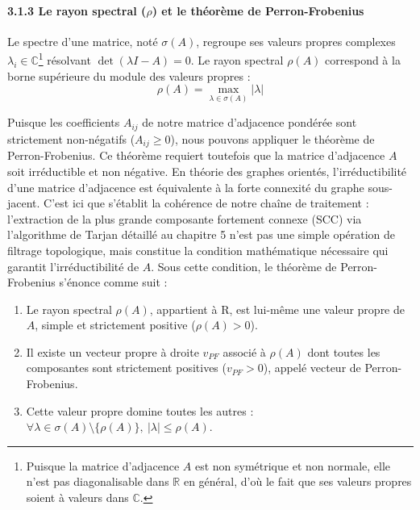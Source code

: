 \documentclass[10pt, a4paper]{article}
\providecommand{\tightlist}{}
\begin{document}
\paragraph{\texorpdfstring{3.1.3 Le rayon spectral (\(\rho\)) et le
théorème de
Perron-Frobenius}{3.1.3 Le rayon spectral (\textbackslash rho) et le théorème de Perron-Frobenius}}\label{le-rayon-spectral-rho-et-le-thuxe9oruxe8me-de-perron-frobenius}

Le spectre d'une matrice, noté \(\sigma(A)\), regroupe ses valeurs
propres complexes
\(\lambda_i \in \mathbb{C}\)\footnote{Puisque la matrice d'adjacence $A$ est non symétrique et non normale, elle n'est pas diagonalisable dans $\mathbb{R}$ en général, d'où le fait que ses valeurs propres soient à valeurs dans $\mathbb{C}$.}
résolvant \(\det(\lambda I - A) = 0\). Le rayon spectral \(\rho(A)\)
correspond à la borne supérieure du module des valeurs propres :
\[\rho(A) = \max_{\lambda \in \sigma(A)} |\lambda|\]

Puisque les coefficients \(A_{ij}\) de notre matrice d'adjacence
pondérée sont strictement non-négatifs (\(A_{ij} \ge 0\)), nous pouvons
appliquer le théorème de Perron-Frobenius. Ce théorème requiert
toutefois que la matrice d'adjacence \(A\) soit irréductible et non
négative. En théorie des graphes orientés, l'irréductibilité d'une
matrice d'adjacence est équivalente à la forte connexité du graphe
sous-jacent. C'est ici que s'établit la cohérence de notre chaîne de
traitement : l'extraction de la plus grande composante fortement connexe
(SCC) via l'algorithme de Tarjan détaillé au chapitre 5 n'est pas une
simple opération de filtrage topologique, mais constitue la condition
mathématique nécessaire qui garantit l'irréductibilité de \(A\). Sous
cette condition, le théorème de Perron-Frobenius s'énonce comme suit :

\begin{enumerate}
\def\labelenumi{\arabic{enumi}.}
\tightlist
\item
  Le rayon spectral \(\rho(A)\), appartient à R, est lui-même une valeur
  propre de \(A\), simple et strictement positive (\(\rho(A) > 0\)).
\item
  Il existe un vecteur propre à droite \(v_{PF}\) associé à \(\rho(A)\)
  dont toutes les composantes sont strictement positives
  (\(v_{PF} > 0\)), appelé vecteur de Perron-Frobenius.
\item
  Cette valeur propre domine toutes les autres :
  \(\forall \lambda \in \sigma(A) \setminus \{\rho(A)\}, \ |\lambda| \le \rho(A)\).
\end{enumerate}
\end{document}
